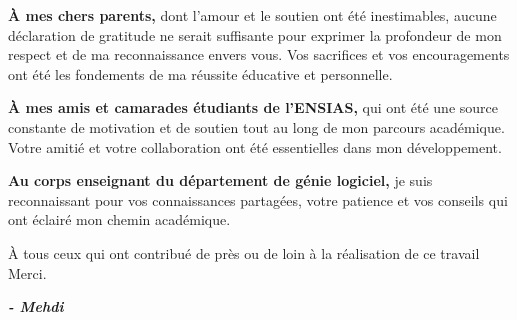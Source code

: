\begin{fquote}
\begin{center}
\thispagestyle{empty}
\large{

\textbf{À mes chers parents,} dont l'amour et le soutien ont été inestimables, aucune déclaration de gratitude ne serait suffisante pour exprimer la profondeur de mon respect et de ma reconnaissance envers vous. Vos sacrifices et vos encouragements ont été les fondements de ma réussite éducative et personnelle.

\textbf{À mes amis et camarades étudiants de l'ENSIAS,} qui ont été une source constante de motivation et de soutien tout au long de mon parcours académique. Votre amitié et votre collaboration ont été essentielles dans mon développement.

\textbf{Au corps enseignant du département de génie logiciel,} je suis reconnaissant pour vos connaissances partagées, votre patience et vos conseils qui ont éclairé mon chemin académique.

À tous ceux qui ont contribué de près ou de loin à la réalisation de ce travail
\\[12pt]
Merci.
}
\end{center}
\bigskip
\medskip
\end{fquote}

\hspace*{\fill} \textbf{\textit{\large{- Mehdi}}}

\clearpage